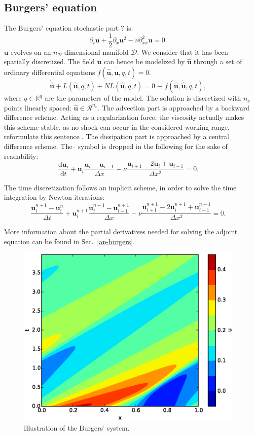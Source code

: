 \documentclass[10pt,openany,onecolumn,a4wide,pof]{article}
\newcommand{\todo}[1]{{\color{red} #1 }}
\newcommand{\gras}[1]{\boldsymbol{#1}}
\newcommand{\Ephaz}{\mathcal{D}}%
\newcommand{\Nphaz}{n_{\mathcal{D}}} %
\newcommand{\fdyn}{f} %
\newcommand{\point}{\gras{u}} %
\begin{document}
\subsection{Burgers' equation}
\label{ssec-burgers}
The Burgers' equation \todo{stochastic part ?}is:
$$ \partial_t \point + \frac{1}{2} \partial_x \point^2 - \nu \partial^2_{xx}\point = 0. $$
$\point$ evolves on an $\Nphaz$-dimensional manifold $\Ephaz$. 
We consider that it has been spatially discretized. The field $\point$ can hence be modelized by $\hat{\point}$ through a set of ordinary differential equations $ \fdyn(\hat{\point},\dot{\hat{\point}},q,t) =0.$
$$ \dot{\hat{\point}} + L(\hat{\point},q,t) + NL(\hat{\point},q,t) = 0 \equiv \fdyn(\hat{\point},\dot{\hat{\point}},q,t), $$
where $q\in \mathbb{R}^{q}$ are the parameters of the model.
The solution is discretized with $n_x$ points linearly spaced: $\hat{\point}\in \mathcal{R}^{n_x}$.
The advection part is approached by a backward difference scheme.
Acting as a regularization force, the viscosity actually makes this scheme stable, as no shock can occur in the considered working range. \todo{reformulate this sentence}.
The dissipation part is approached by a central difference scheme.
The $\hat{\,}$ symbol is dropped in the following for the sake of readability:
\begin{equation}
 \frac{\text{d}\point_i}{\text{d}t} + \point_i \frac{\point_i - \point_{i-1}}{\Delta x} - \nu \frac{\point_{i+1} -2 \point_i + \point_{i-1}}{\Delta x ^2} = 0.
\label{eq-fdyn_burgers_spatial}
\end{equation}

The time discretization follows an implicit scheme, in order to solve the time integration by Newton iterations:
\begin{equation}
 \frac{\point^{n+1}_i - \point^{n}_i}{\Delta t} + \point^{n+1}_i \frac{\point^{n+1}_i - \point^{n+1}_{i-1}}{\Delta x} - \nu \frac{\point^{n+1}_{i+1} -2 \point^{n+1}_i + \point^{n+1}_{i-1}}{\Delta x ^2} = 0.
\label{eq-fdyn_burgers_temporal}
\end{equation}


More information about the partial derivatives needed for solving the adjoint equation can be found in Sec.~\ref{an-burgers}.
\begin{figure}[t]
\center
\includegraphics[height=.35\linewidth]{./burgers.eps}
\caption{\small Illustration of the Burgers' system.}
\label{fig-rmap}
\end{figure}
\end{document}
